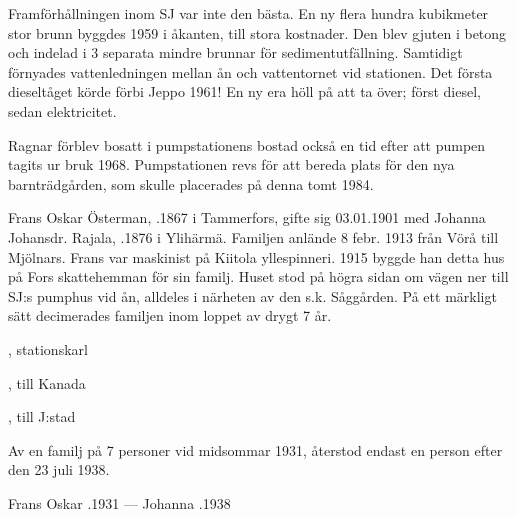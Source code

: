 Framförhållningen inom SJ var inte den bästa. En ny flera hundra kubikmeter stor brunn byggdes 1959 i åkanten, till stora kostnader. Den blev gjuten i betong och indelad i 3 separata mindre brunnar för sedimentutfällning. Samtidigt förnyades vattenledningen mellan ån och vattentornet vid stationen. Det första dieseltåget körde förbi Jeppo 1961! En ny era höll på att ta över; först diesel, sedan elektricitet.

Ragnar förblev bosatt i  pumpstationens bostad också en tid efter att pumpen tagits ur bruk 1968. Pumpstationen revs för att bereda plats för den nya barnträdgården, som skulle placerades på denna tomt 1984.






Frans Oskar Österman, .1867 i Tammerfors, gifte sig 03.01.1901 med Johanna Johansdr. Rajala, .1876 i Ylihärmä. Familjen anlände 8 febr. 1913 från Vörå till Mjölnars. Frans var maskinist på Kiitola yllespinneri. 1915 byggde han detta hus på Fors skattehemman för sin familj. Huset stod på högra sidan om vägen ner till SJ:s pumphus vid ån, alldeles i närheten av den s.k. Såggården. På ett märkligt sätt decimerades familjen inom loppet av drygt 7 år.
\begin{jhchildren}
  \item {}
  \item {}, stationskarl
  \item {}, till Kanada
  \item {}, till J:stad
  \item {}
\end{jhchildren}
Av en familj på 7 personer vid midsommar 1931, återstod endast en person efter den 23 juli 1938.

Frans Oskar .1931  ---  Johanna .1938

